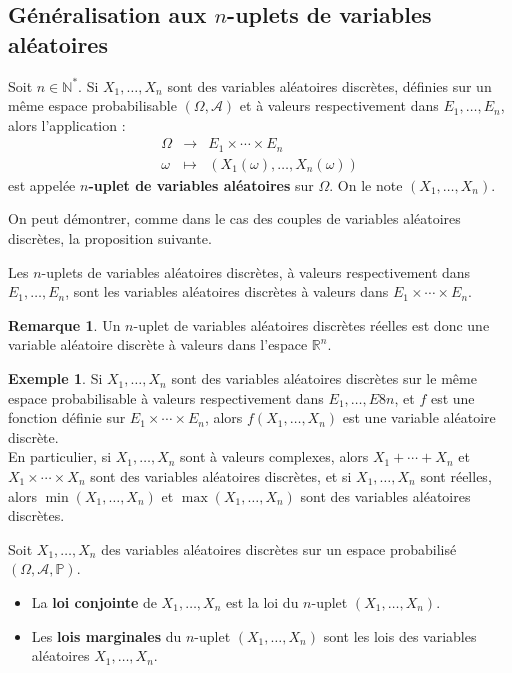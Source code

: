 \documentclass[french]{article}
\renewcommand{\P}{\mathbb{P}}
\newcommand{\N}{\mathbb{N}}
\newcommand{\R}{\mathbb{R}}
\newcommand{\st}{^*}
\theoremstyle{plain}
\theoremstyle{definition}
\newtheorem*{ex}{Exemple}
\newtheorem*{rmq}{Remarque}
\theoremstyle{remark}
\begin{document}
\subsection{Généralisation aux $n$-uplets de variables aléatoires}

\begin{dfn}
	Soit $n\in\N\st$. Si $X_1,\ldots,X_n$ sont des variables aléatoires discrètes, définies sur un même espace probabilisable $(\Omega,\mathcal{A})$ et à valeurs respectivement dans $E_1,\ldots,E_n$, alors l'application :
	$$\begin{array}{rcl}
		\Omega&\longrightarrow&E_1\times\cdots\times E_n\\
		\omega&\longmapsto&(X_1(\omega),\ldots,X_n(\omega))
	\end{array}$$ est appelée \textbf{$n$-uplet de variables aléatoires} sur $\Omega$. On le note $(X_1,\ldots,X_n)$.
\end{dfn}

On peut démontrer, comme dans le cas des couples de variables aléatoires discrètes, la proposition suivante.

\begin{thm}{}%
	Les $n$-uplets de variables aléatoires discrètes, à valeurs respectivement dans $E_1,\ldots,E_n$, sont les variables aléatoires discrètes à valeurs dans $E_1\times\cdots\times E_n$.
\end{thm}

\begin{rmq}
	Un $n$-uplet de variables aléatoires discrètes réelles est donc une variable aléatoire discrète à valeurs dans l'espace $\R^n$.
\end{rmq}

\begin{ex}
	Si $X_1,\ldots,X_n$ sont des variables aléatoires discrètes sur le même espace probabilisable à valeurs respectivement dans $E_1,\ldots,E8n$, et $f$ est une fonction définie sur $E_1\times\cdots\times E_n$, alors $f(X_1,\ldots,X_n)$ est une variable aléatoire discrète.\\
	En particulier, si $X_1,\ldots,X_n$ sont à valeurs complexes, alors $X_1+\cdots+X_n$ et $X_1\times\cdots\times X_n$ sont des variables aléatoires discrètes, et si $X_1,\ldots,X_n$ sont réelles, alors $\min(X_1,\ldots,X_n)$ et $\max(X_1,\ldots,X_n)$ sont des variables aléatoires discrètes.
\end{ex}

\begin{dfn}
	Soit $X_1,\ldots,X_n$ des variables aléatoires discrètes sur un espace probabilisé $(\Omega,\mathcal{A},\P)$.
	\begin{itemize}
		\item La \textbf{loi conjointe} de $X_1,\ldots,X_n$ est la loi du $n$-uplet $(X_1,\ldots,X_n)$.
		\item Les \textbf{lois marginales} du $n$-uplet $(X_1,\ldots,X_n)$ sont les lois des variables aléatoires $X_1,\ldots,X_n$.
	\end{itemize}
\end{dfn}
\end{document}
